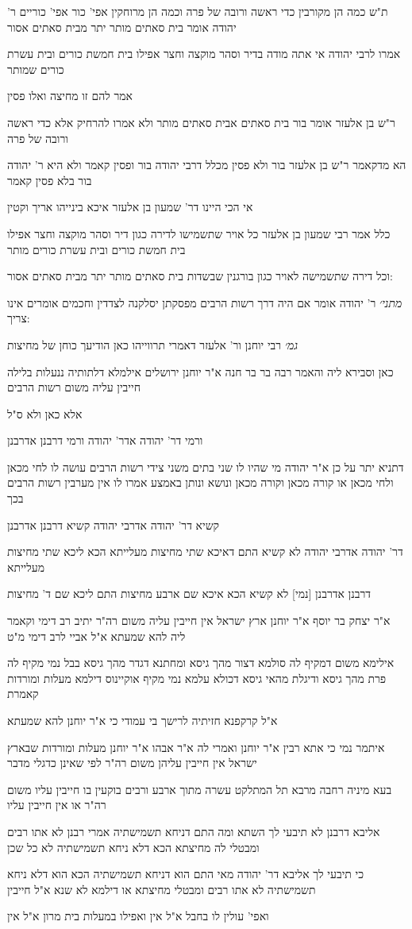 \documentclass[12pt, openany]{book}
\newcommand{\sethebfont}{
\fontsize{10.5pt}{21.0pt} \selectfont
}
\newcommand{\textblock}[1]{
{\sethebfont #1\\}	
}
\begin{document}
\textblock{ת"ש כמה הן מקורבין כדי ראשה ורובה של פרה וכמה הן מרוחקין אפי' כור אפי' כוריים ר' יהודה אומר בית סאתים מותר יתר מבית סאתים אסור}
\textblock{אמרו לרבי יהודה אי אתה מודה בדיר וסהר מוקצה וחצר אפילו בית חמשת כורים ובית עשרת כורים שמותר}
\textblock{אמר להם זו מחיצה ואלו פסין}
\textblock{ר"ש בן אלעזר אומר בור בית סאתים אבית סאתים מותר ולא אמרו להרחיק אלא כדי ראשה ורובה של פרה}
\textblock{הא מדקאמר ר"ש בן אלעזר בור ולא פסין מכלל דרבי יהודה בור ופסין קאמר ולא היא ר' יהודה בור בלא פסין קאמר}
\textblock{אי הכי היינו דר' שמעון בן אלעזר איכא בינייהו אריך וקטין}
\textblock{כלל אמר רבי שמעון בן אלעזר כל אויר שתשמישו לדירה כגון דיר וסהר מוקצה וחצר אפילו בית חמשת כורים ובית עשרת כורים מותר}
\textblock{וכל דירה שתשמישה לאויר כגון בורגנין שבשדות בית סאתים מותר יתר מבית סאתים אסור:}
\textblock{{\large\emph{מתני׳}} ר' יהודה אומר אם היה דרך רשות הרבים מפסקתן יסלקנה לצדדין וחכמים אומרים אינו צריך:}
\textblock{{\large\emph{גמ׳}} רבי יוחנן ור' אלעזר דאמרי תרווייהו כאן הודיעך כוחן של מחיצות}
\textblock{כאן וסבירא ליה והאמר רבה בר בר חנה א"ר יוחנן ירושלים אילמלא דלתותיה ננעלות בלילה חייבין עליה משום רשות הרבים}
\textblock{אלא כאן ולא ס"ל}
\textblock{ורמי דר' יהודה אדר' יהודה ורמי דרבנן אדרבנן}
\textblock{דתניא יתר על כן א"ר יהודה מי שהיו לו שני בתים משני צידי רשות הרבים עושה לו לחי מכאן ולחי מכאן או קורה מכאן וקורה מכאן ונושא ונותן באמצע אמרו לו אין מערבין רשות הרבים בכך}
\textblock{קשיא דר' יהודה אדרבי יהודה קשיא דרבנן אדרבנן}
\textblock{דר' יהודה אדרבי יהודה לא קשיא התם דאיכא שתי מחיצות מעלייתא הכא ליכא שתי מחיצות מעלייתא}
\textblock{דרבנן אדרבנן [נמי] לא קשיא הכא איכא שם ארבע מחיצות התם ליכא שם ד' מחיצות}
\textblock{א"ר יצחק בר יוסף א"ר יוחנן ארץ ישראל אין חייבין עליה משום רה"ר יתיב רב דימי וקאמר ליה להא שמעתא א"ל אביי לרב דימי מ"ט}
\textblock{אילימא משום דמקיף לה סולמא דצור מהך גיסא ומחתנא דגדר מהך גיסא בבל נמי מקיף לה פרת מהך גיסא ודיגלת מהאי גיסא דכולא עלמא נמי מקיף אוקיינוס דילמא מעלות ומורדות קאמרת}
\textblock{א"ל קרקפנא חזיתיה לרישך בי עמודי כי א"ר יוחנן להא שמעתא}
\textblock{איתמר נמי כי אתא רבין א"ר יוחנן ואמרי לה א"ר אבהו א"ר יוחנן מעלות ומורדות שבארץ ישראל אין חייבין עליהן משום רה"ר לפי שאינן כדגלי מדבר}
\textblock{בעא מיניה רחבה מרבא תל המתלקט עשרה מתוך ארבע ורבים בוקעין בו חייבין עליו משום רה"ר או אין חייבין עליו}
\textblock{אליבא דרבנן לא תיבעי לך השתא ומה התם דניחא תשמישתיה אמרי רבנן לא אתו רבים ומבטלי לה מחיצתא הכא דלא ניחא תשמישתיה לא כל שכן}
\textblock{כי תיבעי לך אליבא דר' יהודה מאי התם הוא דניחא תשמישתיה הכא הוא דלא ניחא תשמישתיה לא אתו רבים ומבטלי מחיצתא או דילמא לא שנא א"ל חייבין}
\textblock{ואפי' עולין לו בחבל א"ל אין ואפילו במעלות בית מרון א"ל אין}
\end{document}

